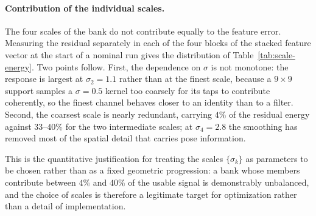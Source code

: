 %
%
%

\paragraph{Contribution of the individual scales.}
The four scales of the bank do not contribute equally to the feature error.
Measuring the residual separately in each of the four blocks of the stacked
feature vector at the start of a nominal run gives the distribution of
Table~\ref{tab:scale-energy}. Two points follow. First, the dependence on
$\sigma$ is not monotone: the response is largest at $\sigma_2=1.1$ rather
than at the finest scale, because a $9\times9$ support samples a
$\sigma=0.5$ kernel too coarsely for its taps to contribute coherently, so
the finest channel behaves closer to an identity than to a filter. Second,
the coarsest scale is nearly redundant, carrying $4\%$ of the residual
energy against $33$--$40\%$ for the two intermediate scales; at
$\sigma_4=2.8$ the smoothing has removed most of the spatial detail that
carries pose information.

This is the quantitative justification for treating the scales
$\{\sigma_k\}$ as parameters to be chosen rather than as a fixed geometric
progression: a bank whose members contribute between $4\%$ and $40\%$ of the
usable signal is demonstrably unbalanced, and the choice of scales is
therefore a legitimate target for optimization rather than a detail of
implementation.

